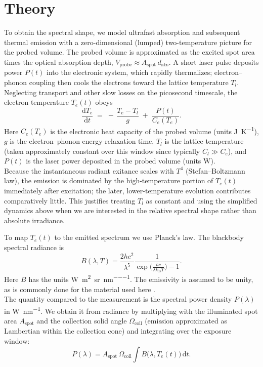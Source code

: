 \documentclass[
	parskip=half,
	a4paper,
]{scrarticle}
\begin{document}
\section{Theory}
To obtain the spectral shape, we model ultrafast absorption and subsequent thermal emission with a zero-dimensional (lumped) two-temperature picture for the probed volume. The probed volume is approximated as the excited spot area times the optical absorption depth, \(V_{\text{probe}} \approx A_{\text{spot}}\,d_{\text{abs}}\). A short laser pulse deposits power \(P(t)\) into the electronic system, which rapidly thermalizes; electron–phonon coupling then cools the electrons toward the lattice temperature \(T_l\). Neglecting transport and other slow losses on the picosecond timescale, the electron temperature \(T_e(t)\) obeys
\begin{equation}
    \frac{\mathrm d T_e}{\mathrm d t}
    \;=\;
    -\,\frac{T_e - T_l}{g}
    \;+\;
    \frac{P(t)}{C_e(T_e)}.
    \label{eq:Te}
\end{equation}
Here \(C_e(T_e)\) is the electronic heat capacity of the probed volume (units \si{J\per K}), \(g\) is the electron–phonon energy-relaxation time, \(T_l\) is the lattice temperature (taken approximately constant over this window since typically \(C_l \gg C_e\)), and \(P(t)\) is the laser power deposited in the probed volume (units \si{W}).\\
Because the instantaneous radiant exitance scales with \(T^4\) (Stefan–Boltzmann law), the emission is dominated by the high-temperature portion of \(T_e(t)\) immediately after excitation; the later, lower-temperature evolution contributes comparatively little. This justifies treating \(T_l\) as constant and using the simplified dynamics above when we are interested in the relative spectral shape rather than absolute irradiance.

To map \(T_e(t)\) to the emitted spectrum we use Planck’s law. The blackbody spectral radiance is
\begin{equation}
    B(\lambda,T)
    = \frac{2hc^{2}}{\lambda^{5}}
      \frac{1}{\exp\bigl(\tfrac{hc}{\lambda k_{\mathrm B}T}\bigr)-1}.
    \label{eq:B}
\end{equation}
Here \(B\) has the units \si{\watt\per\metre\squared\per\steradian\per\nano\metre}. The emissivity is assumed to be unity, as is commonly done for the material used here \cite{sapritsky_black-body_1995}.\\
The quantity compared to the measurement is the spectral power density \(P(\lambda)\) in \si{\watt\per\nano\metre}. We obtain it from radiance by multiplying with the illuminated spot area \(A_{\text{spot}}\) and the collection solid angle \(\Omega_{\text{coll}}\) (emission approximated as Lambertian within the collection cone) and integrating over the exposure window:
\begin{equation}
      P(\lambda) = A_{\text{spot}}\,\Omega_{\text{coll}}
      \int B\bigl(\lambda, T_e(t)\bigr)\,\mathrm dt.
      \label{eq:P}
\end{equation}
\end{document}
